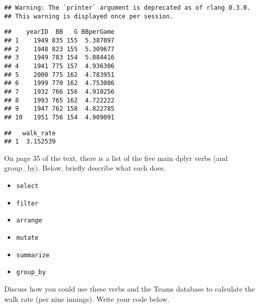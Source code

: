 \documentclass[]{article}
\newenvironment{Shaded}{\begin{snugshade}}{\end{snugshade}}
\newcommand{\KeywordTok}[1]{\textcolor[rgb]{0.13,0.29,0.53}{\textbf{#1}}}
\newcommand{\DataTypeTok}[1]{\textcolor[rgb]{0.13,0.29,0.53}{#1}}
\newcommand{\DecValTok}[1]{\textcolor[rgb]{0.00,0.00,0.81}{#1}}
\newcommand{\StringTok}[1]{\textcolor[rgb]{0.31,0.60,0.02}{#1}}
\newcommand{\CommentTok}[1]{\textcolor[rgb]{0.56,0.35,0.01}{\textit{#1}}}
\newcommand{\OtherTok}[1]{\textcolor[rgb]{0.56,0.35,0.01}{#1}}
\newcommand{\OperatorTok}[1]{\textcolor[rgb]{0.81,0.36,0.00}{\textbf{#1}}}
\newcommand{\NormalTok}[1]{#1}
\begin{document}
\begin{verbatim}
## Warning: The `printer` argument is deprecated as of rlang 0.3.0.
## This warning is displayed once per session.
\end{verbatim}

\begin{verbatim}
##    yearID  BB   G BBperGame
## 1    1949 835 155  5.387097
## 2    1948 823 155  5.309677
## 3    1949 783 154  5.084416
## 4    1941 775 157  4.936306
## 5    2000 775 162  4.783951
## 6    1999 770 162  4.753086
## 7    1932 766 156  4.910256
## 8    1993 765 162  4.722222
## 9    1947 762 158  4.822785
## 10   1951 756 154  4.909091
\end{verbatim}

\begin{Shaded}
\end{Shaded}

\begin{verbatim}
##   walk_rate
## 1  3.152539
\end{verbatim}

On page 35 of the text, there is a list of the five main dplyr verbs
(and group\_by). Below, briefly describe what each does.

\begin{itemize}
\item
  \texttt{select}
\item
  \texttt{filter}
\item
  \texttt{arrange}
\item
  \texttt{mutate}
\item
  \texttt{summarize}
\item
  \texttt{group\_by}
\end{itemize}

Discuss how you could use these verbs and the Teams database to
calculate the walk rate (per nine innings). Write your code below.
\vspace{0.5in}

\newpage

\begin{Shaded}
\end{Shaded}
\end{document}
